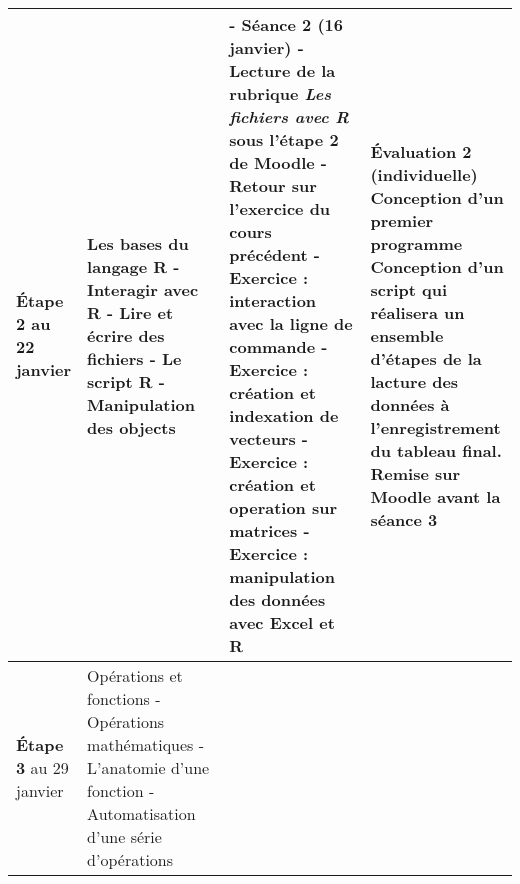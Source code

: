 \documentclass[12]{article}
\begin{document}
\begin{center}
\begin{tabular}{| p{0.1\linewidth} | p{0.3\linewidth} | p{0.3\linewidth} | p{0.3\linewidth} | }
        \hline
        \textbf{Étape 2} \linebreak 16 au 22 janvier & 
        Les bases du langage R\hfill\hfill \linebreak\linebreak 
            - Interagir avec R\hfill\hfill \linebreak
            - Lire et écrire des fichiers\hfill\hfill \linebreak
            - Le script R\hfill\hfill \linebreak
            - Manipulation des objects\hfill\hfill &
        - \textbf{Séance 2} (16 janvier)\hfill\hfill \linebreak
        - Lecture de la rubrique \textit{Les fichiers avec R} sous l'étape 2 de Moodle\hfill\hfill \linebreak
        - Retour sur l'exercice du cours précédent\hfill\hfill \linebreak
        - Exercice : interaction avec la ligne de commande\hfill\hfill \linebreak
        - Exercice : création et indexation de vecteurs\hfill\hfill \linebreak
        - Exercice : création et operation sur matrices\hfill\hfill \linebreak
        - Exercice : manipulation des données avec Excel et R\hfill\hfill &
        \textbf{Évaluation 2} (individuelle) \linebreak
        \textbf{Conception d'un premier programme}\hfill\hfill \linebreak
        Conception d'un script qui réalisera un ensemble d'étapes de la lacture
        des données à l'enregistrement du tableau final. Remise sur Moodle
        avant la séance 3\hfill\hfill\hfill \\
        \hline
        \textbf{Étape 3} \linebreak 23 au 29 janvier & 
        Opérations et fonctions\hfill\hfill \linebreak\linebreak 
            - Opérations mathématiques\hfill\hfill \linebreak
            - L'anatomie d'une fonction\hfill\hfill \linebreak
            - Automatisation d'une série d'opérations\hfill &

\end{tabular}
\end{center}
\end{document}
